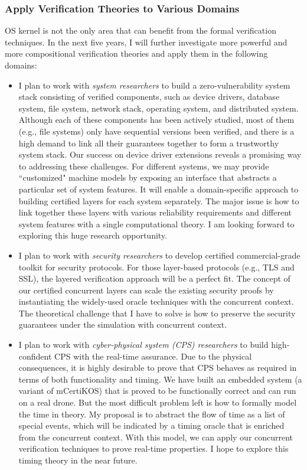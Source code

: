 \documentclass[a4paper, 10pt]{article}
\begin{document}
\begin{small}
\subsubsection*{\small Apply Verification Theories to Various Domains}
OS kernel is not the only area that can benefit
from the formal verification techniques. In the next five years, I will further investigate more powerful and more compositional  verification theories
and apply them
in the following domains: 
\begin{itemize}
\item I plan to work with \emph{system researchers} to build a zero-vulnerability system stack consisting of verified components, such as device drivers,
database system, file system, network stack, operating system,
 and distributed system.
 Although each of these components has been actively studied,
 most of them  (e.g., file systems) only have sequential versions been verified, and there is a high demand to 
link all their guarantees together
to form  a  trustworthy system stack. Our success on  device driver extensions
reveals a promising way to addressing these challenges.
For different systems, we may
provide ``customized" machine models
by exposing an  interface that abstracts  a particular set of system features.
It will enable a domain-specific approach to building certified layers for each system separately.
The major issue is how to link together these layers with various reliability requirements
and different system features with a single computational theory.
I am looking forward to exploring this huge research opportunity.


\item I plan to work with \emph{security researchers}
to  develop certified 
commercial-grade toolkit for security
protocols. 
For those layer-based protocols (e.g., TLS and SSL), the layered verification approach will be a perfect fit.
The concept of our certified concurrent  layers can scale the existing security proofs by instantiating the widely-used oracle techniques
with the concurrent context. The theoretical challenge that I have to solve is
how to preserve the security guarantees under the simulation with concurrent context.

\item I plan to work with
\emph{cyber-physical system (CPS) researchers} to build
high-confident CPS with the real-time assurance.
Due to the physical consequences, it is highly desirable to
prove that CPS behaves as required in terms of both functionality and timing. 
We have built an embedded system (a variant of mCertiKOS) that is proved to be functionally correct and can run on a real drone. But the most difficult problem left is how to formally
model the time in theory. My proposal is to abstract the flow of time  as a list of special events, which will be indicated by a timing oracle that is enriched from the concurrent context.
With this model, we can apply 
our concurrent verification techniques to prove
 real-time properties. I hope to explore this timing theory in the near future.
 

\end{itemize}
\end{small}
\end{document}
